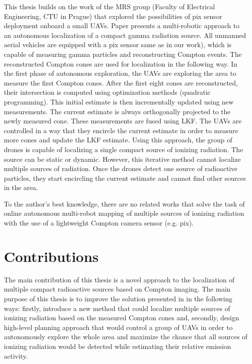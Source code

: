 This thesis builds on the work of the MRS group (Faculty of Electrical Engineering, CTU in Prague) that explored the possibilities of \ac{pix} sensor deployment onboard a small \ac{UAV}s. 
Paper \cite{baca2021gamma} presents a multi-robotic approach to an autonomous localization of a compact gamma radiation source. 
All unmanned aerial vehicles are equipped with a \ac{pix} sensor same as in our work), which is capable of measuring gamma particles and reconstructing Compton events. 
The reconstructed Compton cones are used for localization in the following way.
In the first phase of autonomous exploration, the \ac{UAV}s are exploring the area to measure the first Compton cones. 
After the first eight cones are reconstructed, their intersection is computed using optimization methods (quadratic programming). 
This initial estimate is then incrementally updated using new measurements. 
The current estimate is always orthogonally projected to the newly measured cone. 
These measurements are fused using \ac{LKF}. 
The \ac{UAV}s are controlled in a way that they encircle the current estimate in order to measure more cones and update the \ac{LKF} estimate.
Using this approach, the group of drones is capable of localizing a single compact source of ionizing radiation. 
The source can be static or dynamic. 
However, this iterative method cannot localize multiple sources of radiation.
Once the drones detect one source of radioactive particles, they start encircling the current estimate and cannot find other sources in the area.

To the author's best knowledge, there are no related works that solve the task of online autonomous multi-robot mapping of multiple sources of ionizing radiation with the use of a lightweight Compton camera sensor (e.g. \ac{pix}).

\section{Contributions}
The main contribution of this thesis is a novel approach to the localization of multiple compact radioactive sources based on Compton imaging.
The main purpose of this thesis is to improve the solution presented in \cite{baca2021gamma} in the following ways: 
firstly, introduce a new method that could localize multiple sources of ionizing radiation based on the measured Compton cones and, 
secondly, 
design high-level planning approach that would control a group of \ac{UAV}s in order to autonomously explore the whole area and maximize the chance that all sources of ionizing radiation would be detected while estimating their relative emission activity.

